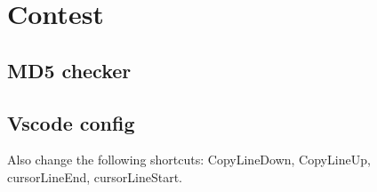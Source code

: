 \chapter{Contest}


\section{MD5 checker}

\section{Vscode config}
Also change the following shortcuts: CopyLineDown, CopyLineUp, cursorLineEnd, cursorLineStart.
    

